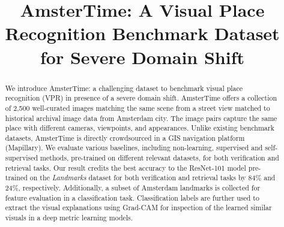 \documentclass[a4paper,conference]{IEEEtran}
\begin{document}
\title{AmsterTime: A Visual Place Recognition Benchmark Dataset for Severe Domain Shift}






\author{
}









\maketitle


\newcommand{\amstertime}{AmsterTime\xspace}
\newcommand{\amsterdam}{GLDv2-Amsterdam\xspace}


\begin{abstract}
We introduce \amstertime: a challenging dataset to benchmark visual place recognition (VPR) in presence of a severe domain shift. \amstertime  offers a collection of 2,500 well-curated images matching the same scene from a street view matched to historical archival image data from Amsterdam city. The image pairs capture the same place with different cameras, viewpoints, and appearances.  Unlike existing benchmark datasets, \amstertime is directly crowdsourced in a GIS navigation platform (Mapillary). We evaluate various baselines, including non-learning, supervised and self-supervised methods, pre-trained on different relevant datasets, for both verification and retrieval tasks. Our result credits the best accuracy to the ResNet-101 model pre-trained on the \textit{Landmarks} dataset for both verification and retrieval tasks by 84\% and 24\%, respectively. Additionally, a subset of Amsterdam landmarks is collected for feature evaluation in a classification task. Classification labels are further used to extract the visual explanations using Grad-CAM for inspection of the learned similar visuals in a deep metric learning models.
\end{abstract} 
\end{document}
